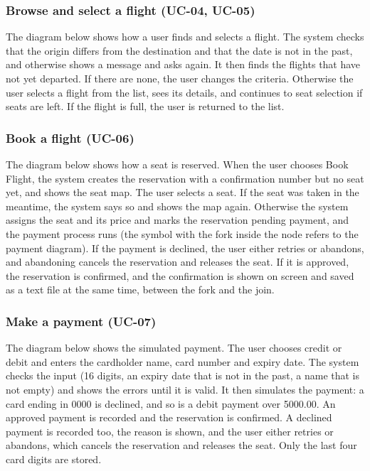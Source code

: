 \subsubsection*{Browse and select a flight (UC-04, UC-05)}

The diagram below shows how a user finds and selects a flight. The system
checks that the origin differs from the destination and that the date is not in
the past, and otherwise shows a message and asks again. It then finds the
flights that have not yet departed. If there are none, the user changes the
criteria. Otherwise the user selects a flight from the list, sees its details,
and continues to seat selection if seats are left. If the flight is full, the
user is returned to the list.


\subsubsection*{Book a flight (UC-06)}

The diagram below shows how a seat is reserved. When the user chooses Book
Flight, the system creates the reservation with a confirmation number but no
seat yet, and shows the seat map. The user selects a seat. If the seat was taken
in the meantime, the system says so and shows the map again. Otherwise the
system assigns the seat and its price and marks the reservation pending
payment, and the payment process runs (the symbol with the
fork inside the node refers to the payment diagram). If the payment is
declined, the user either retries or abandons, and abandoning cancels the
reservation and releases the seat. If it is approved, the reservation is
confirmed, and the confirmation is shown on screen and saved as a text file at
the same time, between the fork and the join.


\subsubsection*{Make a payment (UC-07)}

The diagram below shows the simulated payment. The user chooses credit or debit
and enters the cardholder name, card number and expiry date. The system checks
the input (16 digits, an expiry date that is not in the past, a name that is not
empty) and shows the errors until it is valid. It then simulates the payment: a
card ending in 0000 is declined, and so is a debit payment over 5000.00. An
approved payment is recorded and the reservation is confirmed. A declined
payment is recorded too, the reason is shown, and the user either retries or
abandons, which cancels the reservation and releases the seat. Only the last
four card digits are stored.

